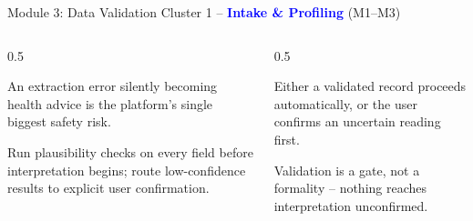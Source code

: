 \documentclass[9pt,aspectratio=169]{beamer}
\begin{document}
\begin{frame}{Module 3: Data Validation}
\textcolor{black!55}{\scriptsize Cluster 1 -- \textcolor{blue}{\textbf{Intake \& Profiling}} (M1--M3)}\\[2pt]
\begin{columns}[T,onlytextwidth]
\begin{column}{0.5\textwidth}
\begin{tcolorbox}[colback=blue!7,colframe=blue!55!black,title=\textbf{Motivation},boxrule=0.6pt,arc=1mm,left=5pt,right=5pt,top=3pt,bottom=3pt,fonttitle=\small]
\footnotesize An extraction error silently becoming health advice is the platform's single biggest safety risk.
\end{tcolorbox}
\vspace{5pt}
\begin{tcolorbox}[colback=teal!7,colframe=teal!55!black,title=\textbf{Method},boxrule=0.6pt,arc=1mm,left=5pt,right=5pt,top=3pt,bottom=3pt,fonttitle=\small]
\footnotesize Run plausibility checks on every field before interpretation begins; route low-confidence results to explicit user confirmation.
\end{tcolorbox}
\end{column}
\begin{column}{0.5\textwidth}
\begin{tcolorbox}[colback=green!8,colframe=green!45!black,title=\textbf{Result},boxrule=0.6pt,arc=1mm,left=5pt,right=5pt,top=3pt,bottom=3pt,fonttitle=\small]
\footnotesize Either a validated record proceeds automatically, or the user confirms an uncertain reading first.
\end{tcolorbox}
\vspace{5pt}
\begin{tcolorbox}[colback=orange!10,colframe=orange!65!black,title=\textbf{Conclusion},boxrule=0.6pt,arc=1mm,left=5pt,right=5pt,top=3pt,bottom=3pt,fonttitle=\small]
\footnotesize Validation is a gate, not a formality -- nothing reaches interpretation unconfirmed.
\end{tcolorbox}
\end{column}
\end{columns}
\end{frame}
\end{document}

